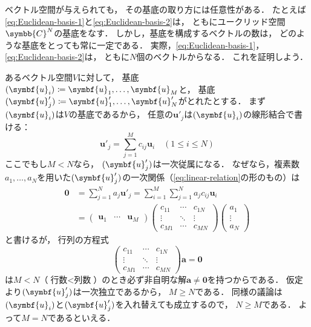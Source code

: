 \documentclass[
]{sotsu}
\begin{document}
\quad 
ベクトル空間が与えられても，
その基底の取り方には任意性がある．
たとえば\cref{eq:Euclidean-basis-1}と\cref{eq:Euclidean-basis-2}は，
ともにユークリッド空間$\symbb{C}^N$の基底をなす．
しかし，基底を構成するベクトルの数は，
どのような基底をとっても常に一定である．
実際，\cref{eq:Euclidean-basis-1}，\cref{eq:Euclidean-basis-2}は，
ともに$N$個のベクトルからなる．
これを証明しよう．

あるベクトル空間$V$に対して，
基底$\sequ{\symbf{u}_i} \coloneq \symbf{u}_1, \dots, \symbf{u}_M$と，
基底$\sequ{\symbf{u}'_j} \coloneq \symbf{u}'_1, \dots, \symbf{u}'_N$がとれたとする．
まず$\sequ{\symbf{u}_i}$は$V$の基底であるから，
任意の$\symbf{u}'_j$は$\sequ{\symbf{u}_i}$の線形結合で書ける：
\begin{equation*}
    \symbf{u}'_j = \sum_{j = 1}^{M} c_{ij} \symbf{u}_i
    \quad ( 1 \leq i \leq N )
\end{equation*}
ここでもし$M < N$なら，
$\sequ{\symbf{u}'_j}$は一次従属になる．
なぜなら，複素数$a_1, \dots, a_N$を用いた$\sequ{\symbf{u}'_j}$の一次関係（\cref{eq:linear-relation}の形のもの）は
\begin{equation*}
    \begin{split}
        \symbf{0} &= \sum_{j = 1}^{N} a_j \symbf{u}'_j
            = \sum_{i = 1}^{M} \sum_{j = 1}^{N} a_j c_{ij} \symbf{u}_i
            \\
            &= 
            \begin{pmatrix}
                \symbf{u}_1  &  \cdots  &  \symbf{u}_M
            \end{pmatrix}
            \begin{pmatrix}
                c_{11}  &  \cdots  &  c_{1N}  \\
                \vdots  &  \ddots  &  \vdots  \\
                c_{M1}  &  \cdots  &  c_{MN}
            \end{pmatrix}
            \begin{pmatrix}
                a_1  \\  \vdots  \\  a_N
            \end{pmatrix}
    \end{split}
\end{equation*}
と書けるが，
行列の方程式
\begin{equation*}
    \begin{pmatrix}
        c_{11}  &  \cdots  &  c_{1N}  \\
        \vdots  &  \ddots  &  \vdots  \\
        c_{M1}  &  \cdots  &  c_{MN}
    \end{pmatrix}
    \symbf{a}
    =
    \symbf{0}
\end{equation*}
は$M < N$（$\text{行数} < \text{列数}$）のとき必ず非自明な解$\symbf{a} \neq \symbf{0}$を持つからである．
仮定より$\sequ{\symbf{u}'_j}$は一次独立であるから，
$M \geq N$である．
同様の議論は$\sequ{\symbf{u}_i}$と$\sequ{\symbf{u}'_j}$を入れ替えても成立するので，
$N \geq M$である．
よって$M = N$であるといえる．
\end{document}
